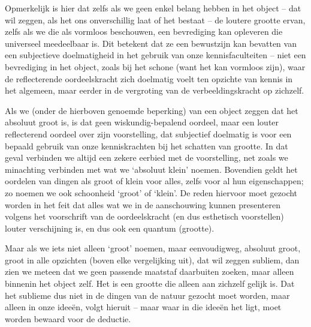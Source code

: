 Opmerkelijk is hier dat zelfs als we geen enkel belang hebben in het object – dat wil zeggen, als het ons onverschillig laat of het bestaat – de loutere grootte ervan, zelfs als we die als vormloos beschouwen, een bevrediging kan opleveren die universeel meedeelbaar is. Dit betekent dat ze een bewustzijn kan bevatten van een subjectieve doelmatigheid in het gebruik van onze kennisfaculteiten – niet een bevrediging in het object, zoals bij het schone (want het kan vormloos zijn), waar de reflecterende oordeelskracht zich doelmatig voelt ten opzichte van kennis in het algemeen, maar eerder in de vergroting van de verbeeldingskracht op zichzelf.

Als we (onder de hierboven genoemde beperking) van een object zeggen dat het absoluut groot is, is dat geen wiskundig-bepalend oordeel, maar een louter reflecterend oordeel over zijn voorstelling, dat subjectief doelmatig is voor een bepaald gebruik van onze kenniskrachten bij het schatten van grootte. In dat geval verbinden we altijd een zekere eerbied met de voorstelling, net zoals we minachting verbinden met wat we ‘absoluut klein’ noemen. Bovendien geldt het oordelen van dingen als groot of klein voor alles, zelfs voor al hun eigenschappen; zo noemen we ook schoonheid ‘groot’ of ‘klein’. De reden hiervoor moet gezocht worden in het feit dat alles wat we in de aanschouwing kunnen presenteren volgens het voorschrift van de oordeelskracht (en dus esthetisch voorstellen) louter verschijning is, en dus ook een quantum (grootte).

Maar als we iets niet alleen ‘groot’ noemen, maar eenvoudigweg, absoluut groot, groot in alle opzichten (boven elke vergelijking uit), dat wil zeggen subliem, dan zien we meteen dat we geen passende maatstaf daarbuiten zoeken, maar alleen binnenin het object zelf. Het is een grootte die alleen aan zichzelf gelijk is. Dat het sublieme dus niet in de dingen van de natuur gezocht moet worden, maar alleen in onze ideeën, volgt hieruit – maar waar in die ideeën het ligt, moet worden bewaard voor de deductie.

